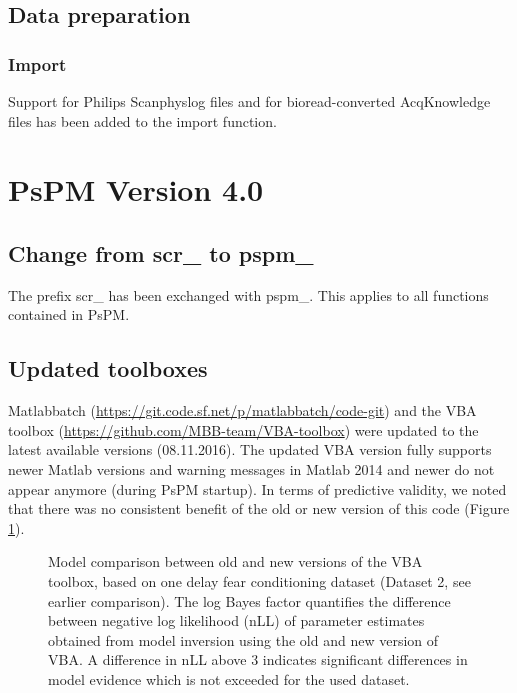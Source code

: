 \documentclass[english]{article}
\numberwithin{equation}{section}
\numberwithin{figure}{section}
\begin{document}
\subsection*{Data preparation}

\subsubsection*{Import}

Support for Philips Scanphyslog files and for bioread-converted AcqKnowledge
files has been added to the import function.

\section{PsPM Version 4.0}

\subsection*{Change from scr\_ to pspm\_}

The prefix scr\_ has been exchanged with pspm\_. This applies to all
functions contained in PsPM.

\subsection*{Updated toolboxes}

Matlabbatch (\url{https://git.code.sf.net/p/matlabbatch/code-git})
and the VBA toolbox (\url{https://github.com/MBB-team/VBA-toolbox})
were updated to the latest available versions (08.11.2016). The updated
VBA version fully supports newer Matlab versions and warning messages
in Matlab 2014 and newer do not appear anymore (during PsPM startup).
In terms of predictive validity, we noted that there was no consistent
benefit of the old or new version of this code (Figure \ref{fig:VBA_compare_3.2}).

\begin{figure}

\caption{\label{fig:VBA_compare_3.2}Model comparison between old and new versions
of the VBA toolbox, based on one delay fear conditioning dataset (Dataset
2, see earlier comparison). The log Bayes factor quantifies the difference
between negative log likelihood (nLL) of parameter estimates obtained
from model inversion using the old and new version of VBA. A difference
in nLL above 3 indicates significant differences in model evidence
which is not exceeded for the used dataset.}

\end{figure}
\end{document}
